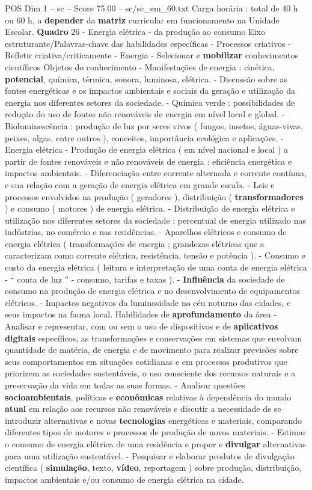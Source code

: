 \begin{textsample}{POS Dim 1 – sc – Score 75.00 – sc/sc\_em\_60.txt}
Carga horária : total de 40 h ou 60 h, a \textbf{depender} da \textbf{matriz} curricular em funcionamento na Unidade Escolar. \textbf{Quadro} 26 - Energia elétrica - da produção ao consumo Eixo estruturante/Palavras-chave das habilidades específicas - Processos criativos - Refletir criativa/criticamente - Energia - Selecionar e \textbf{mobilizar} conhecimentos científicos Objetos do conhecimento - Manifestações de energia : cinética, \textbf{potencial}, química, térmica, sonora, luminosa, elétrica. - Discussão sobre as fontes energéticas e os impactos ambientais e sociais da geração e utilização da energia nos diferentes setores da sociedade. - Química verde : possibilidades de redução do uso de fontes não renováveis de energia em nível local e global. - Bioluminescência : produção de luz por seres vivos ( fungos, insetos, águas-vivas, peixes, algas, entre outros ), conceitos, importância ecológica e aplicações. - Energia elétrica - Produção de energia elétrica ( em nível nacional e local ) a partir de fontes renováveis e não renováveis de energia : eficiência energética e impactos ambientais. - Diferenciação entre corrente alternada e corrente contínua, e sua relação com a geração de energia elétrica em grande escala. - Leis e processos envolvidos na produção ( geradores ), distribuição ( \textbf{transformadores} ) e consumo ( motores ) de energia elétrica. - Distribuição de energia elétrica e utilização nos diferentes setores da sociedade : percentual de energia utilizado nas indústrias, no comércio e nas residências. - Aparelhos elétricos e consumo de energia elétrica ( transformações de energia ; grandezas elétricas que a caracterizam como corrente elétrica, resistência, tensão e potência ). - Consumo e custo da energia elétrica ( leitura e interpretação de uma conta de energia elétrica - “ conta de luz ” - consumo, tarifas e taxas ). - \textbf{Influência} da sociedade de consumo na produção de energia elétrica e no desenvolvimento de equipamentos elétricos. - Impactos negativos da luminosidade no céu noturno das cidades, e seus impactos na fauna local.
Habilidades de \textbf{aprofundamento} da área - Analisar e representar, com ou sem o uso de dispositivos e de \textbf{aplicativos} \textbf{digitais} específicos, as transformações e conservações em sistemas que envolvam quantidade de matéria, de energia e de movimento para realizar previsões sobre seus comportamentos em situações cotidianas e em processos produtivos que priorizem as sociedades sustentáveis, o uso consciente dos recursos naturais e a preservação da vida em todas as suas formas. - Analisar questões \textbf{socioambientais}, políticas e \textbf{econômicas} relativas à dependência do mundo \textbf{atual} em relação aos recursos não renováveis e discutir a necessidade de se introduzir alternativas e novas \textbf{tecnologias} energéticas e materiais, comparando diferentes tipos de motores e processos de produção de novos materiais. - Estimar o consumo de energia elétrica de uma residência e propor e \textbf{divulgar} alternativas para uma utilização sustentável. - Pesquisar e elaborar produtos de divulgação científica ( \textbf{simulação}, texto, \textbf{vídeo}, reportagem ) sobre produção, distribuição, impactos ambientais e/ou consumo de energia elétrica na cidade.

\end{textsample}
